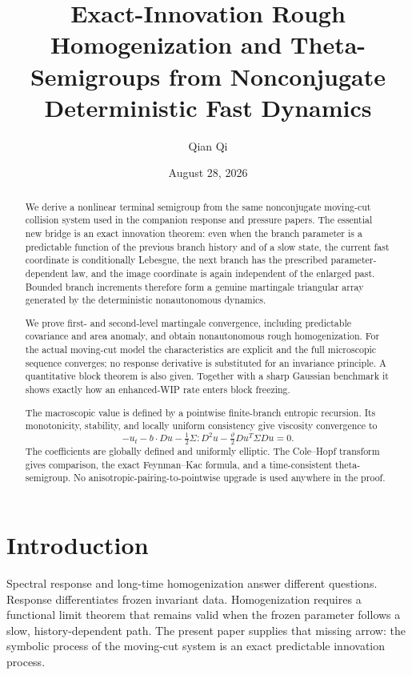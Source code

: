 \documentclass[11pt,reqno]{amsart}
\title[Exact-innovation rough homogenization]{Exact-Innovation Rough Homogenization and Theta-Semigroups from Nonconjugate Deterministic Fast Dynamics}
\author{Qian Qi}
\date{August 28, 2026}
\theoremstyle{definition}
\theoremstyle{remark}
\begin{document}
\begin{abstract}
We derive a nonlinear terminal semigroup from the same nonconjugate
moving-cut collision system used in the companion response and pressure
papers.  The essential new bridge is an exact innovation theorem: even when
the branch parameter is a predictable function of the previous branch
history and of a slow state, the current fast coordinate is conditionally
Lebesgue, the next branch has the prescribed parameter-dependent law, and the
image coordinate is again independent of the enlarged past.  Bounded branch
increments therefore form a genuine martingale triangular array generated by
the deterministic nonautonomous dynamics.

We prove first- and second-level martingale convergence, including predictable
covariance and area anomaly, and obtain nonautonomous rough homogenization.
For the actual moving-cut model the characteristics are explicit and the
full microscopic sequence converges; no response derivative is substituted
for an invariance principle.  A quantitative block theorem is also given.
Together with a sharp Gaussian benchmark it shows exactly how an enhanced-WIP
rate enters block freezing.

The macroscopic value is defined by a pointwise finite-branch entropic
recursion.  Its monotonicity, stability, and locally uniform consistency give
viscosity convergence to
\[
-u_t-b\cdot Du-\tfrac12\Sigma:D^2u
-\tfrac\vartheta2 Du^T\Sigma Du=0.
\]
The coefficients are globally defined and uniformly elliptic.  The Cole--Hopf
transform gives comparison, the exact Feynman--Kac formula, and a
time-consistent theta-semigroup.  No anisotropic-pairing-to-pointwise upgrade
is used anywhere in the proof.
\end{abstract}

\maketitle
\tableofcontents

\section{Introduction}

Spectral response and long-time homogenization answer different questions.
Response differentiates frozen invariant data.  Homogenization requires a
functional limit theorem that remains valid when the frozen parameter follows
a slow, history-dependent path.  The present paper supplies that missing
arrow: the symbolic process of the moving-cut system is an exact predictable
innovation process.
\end{document}
